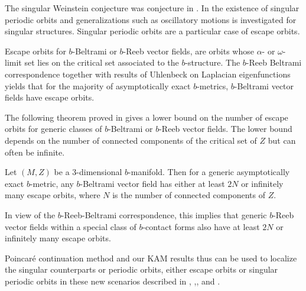 The singular Weinstein conjecture was conjecture in \cite{MO20}. 
In \cite{cedricdanieleva} the existence of  singular periodic orbits  and  generalizations
such as oscillatory motions is investigated for singular structures. Singular periodic orbits are a particular case of escape orbits.




Escape orbits for $b$-Beltrami or $b$-Reeb vector fields, are orbits whose $\alpha$- or $\omega$-limit set lies on the critical set associated to the $b$-structure. The $b$-Reeb Beltrami correspondence together with results of Uhlenbeck \cite{uhlenbeck} on Laplacian eigenfunctions yields that for the majority of asymptotically exact $b$-metrics, $b$-Beltrami vector fields have escape orbits.

 The following theorem proved in \cite{cedricdanielevajosep} gives a lower bound on the number of escape orbits for generic classes of $b$-Beltrami or $b$-Reeb vector fields. The lower bound depends on the number of connected components of the critical set of $Z$ but can often be infinite.

\begin{theorem}{\cite{cedricdanielevajosep}}
    Let $(M,Z)$ be a $3$-dimensional $b$-manifold. Then for a generic asymptotically exact $b$-metric, any $b$-Beltrami vector field has either at least $2N$ or infinitely many escape orbits, where $N$ is the number of connected components of $Z$.
\end{theorem}

In view of the $b$-Reeb-Beltrami correspondence, this implies that generic $b$-Reeb vector fields within a special class of $b$-contact forms also have at least $2N$ or infinitely many escape orbits.

Poincaré continuation method and our KAM results thus can be used to localize the singular counterparts or periodic orbits, either escape orbits or singular periodic orbits in these new scenarios described in \cite{eva}, \cite{MO20},\cite{cedricdanieleva}, and \cite{cedricdanielevajosep}.
\endinput

